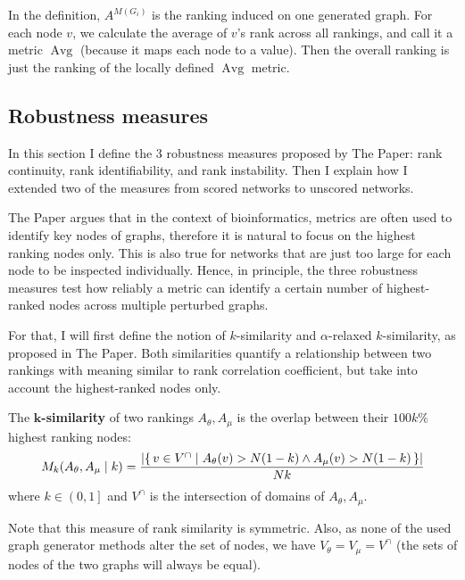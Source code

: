 In the definition, $A^{M(G_i)}$ is the ranking induced on one generated graph.
For each node $v$, we calculate the average of $v$'s rank across all rankings, and call it a metric $\operatorname{Avg}$ (because it maps each node to a value).
Then the overall ranking is just the ranking of the locally defined $\operatorname{Avg}$ metric.

\subsection{Robustness measures}\label{sec:robustness_measures}

In this section I define the 3 robustness measures proposed by The Paper: rank continuity, rank identifiability, and rank instability.
Then I explain how I extended two of the measures from scored networks to unscored networks.

The Paper argues that in the context of bioinformatics, metrics are often used to identify key nodes of graphs, therefore it is natural to focus on the highest ranking nodes only.
This is also true for networks that are just too large for each node to be inspected individually\citeneeded.
Hence, in principle, the three robustness measures test how reliably a metric can identify a certain number of highest-ranked nodes across multiple perturbed graphs.


For that, I will first define the notion of $k$-similarity and $\alpha$-relaxed $k$-similarity, as proposed in The Paper.
Both similarities quantify a relationship between two rankings with meaning similar to rank correlation coefficient, but take into account the highest-ranked nodes only.

\begin{definition}[$\bm{k}$-similarity]
    The \textbf{$\bm{k}$-similarity} of two rankings $A_\theta, A_\mu$ is the overlap between their $100k\%$ highest ranking nodes:
    \[ M_k(A_\theta, A_\mu \mid k) = \frac{\left\lvert \left\{\, v \in V^{\cap} \mid  A_\theta(v) > N(1-k) \wedge A_\mu(v) > N(1-k)  \, \right\} \right\rvert}{Nk} \]
    where $k \in \left( 0, 1 \right]$ and $V^{\cap}$ is the intersection of domains of $A_\theta, A_\mu$.
\end{definition}

Note that this measure of rank similarity is symmetric.
Also, as none of the used graph generator methods alter the set of nodes, we have $V_\theta = V_\mu = V^{\cap}$ (the sets of nodes of the two graphs will always be equal).

